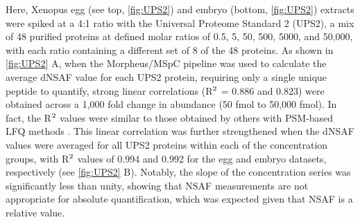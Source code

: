 Here, Xenopus egg (see top, \ref{fig:UPS2}) and embryo (bottom, \ref{fig:UPS2}) extracts were spiked at a 4:1 ratio with the Universal Proteome Standard 2 (UPS2), a mix of 48 purified proteins at defined molar ratios of 0.5, 5, 50, 500, 5000, and 50,000, with each ratio containing a different set of 8 of the 48 proteins.
As shown in \ref{fig:UPS2} A, when the Morpheus/MSpC pipeline was used to calculate the average dNSAF value for each UPS2 protein, requiring only a single unique peptide to quantify, strong linear correlations (R$\textsuperscript{2}$ = 0.886 and 0.823) were obtained across a 1,000 fold change in abundance (50 fmol to 50,000 fmol).
In fact, the R$\textsuperscript{2}$ values were similar to those obtained by others with PSM-based LFQ methods \citep{cox14, tu14}.
This linear correlation was further strengthened when the dNSAF values were averaged for all UPS2 proteins within each of the concentration groups, with R$\textsuperscript{2}$ values of 0.994 and 0.992 for the egg and embryo datasets, respectively (see \ref{fig:UPS2} B).
Notably, the slope of the concentration series was significantly less than unity, showing that NSAF measurements are not appropriate for absolute quantification, which was expected given that NSAF is a relative value.  

